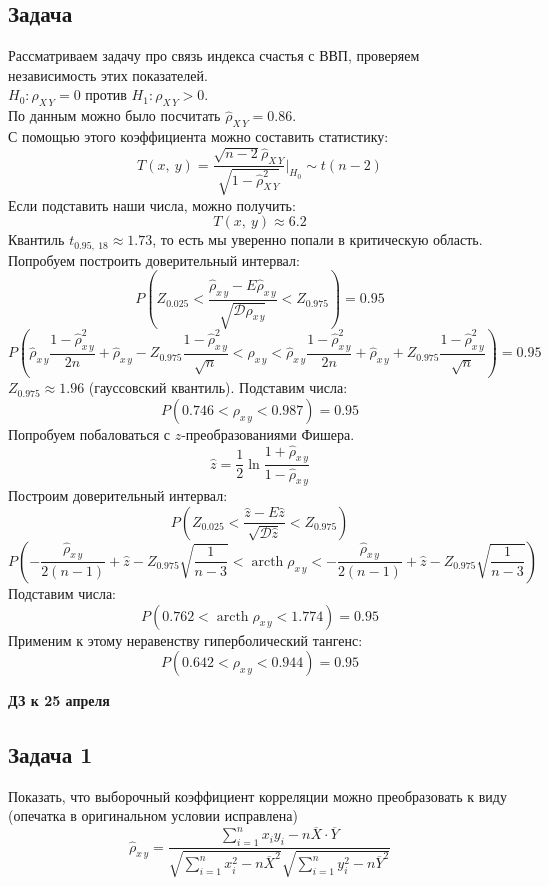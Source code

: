 \documentclass[12pt, a4paper]{article}
\newcommand{\dev}{\mathcal{D}}
\begin{document}
\subsection*{Задача}
Рассматриваем задачу про связь индекса счастья с ВВП, проверяем независимость этих показателей.\\
$H_0: \rho_{X\, Y} = 0$ против $H_1: \rho_{X\, Y} > 0$.\\
По данным можно было посчитать $\hat \rho_{X\, Y} = 0.86$.\\
С помощью этого коэффициента можно составить статистику:
\[
T(x,\ y) = \frac{\sqrt{n - 2} \hat\rho_{X\, Y}}{\sqrt{1 - \hat \rho_{X\, Y}^2}} \Big|_{H_0} \sim t(n - 2)
\]
Если подставить наши числа, можно получить:
\[
T(x,\ y) \approx 6.2
\]
Квантиль $t_{0.95,\ 18} \approx 1.73$, то есть мы уверенно попали в критическую область.\\
Попробуем построить доверительный интервал:
\[P\left( Z_{0.025} < \frac{\hat \rho_{x\, y} - E\hat \rho_{x\, y}}{\sqrt{\dev \hat \rho_{x\, y}}} < Z_{0.975} \right) = 0.95\]
\[P\left( \hat \rho_{x\, y} \frac{1 - \hat\rho^2_{x\, y}}{2n} + \hat \rho_{x\, y} - Z_{0.975} \frac{1 - \hat\rho_{x\, y}^2}{\sqrt{n}} < \rho_{x\, y} < \hat\rho_{x\, y} \frac{1 - \hat\rho^2_{x\, y}}{2n} + \hat \rho_{x\, y} + Z_{0.975} \frac{1 - \hat\rho_{x\, y}^2}{\sqrt{n}} \right) = 0.95\]
$Z_{0.975} \approx 1.96$ (гауссовский квантиль). Подставим числа:
\[P\left( 0.746 < \rho_{x\, y} < 0.987 \right) = 0.95\]
Попробуем побаловаться с $z$-преобразованиями Фишера.
\[
\hat z = \frac{1}{2} \ln \frac{1 + \hat \rho_{x\, y}}{1 - \hat \rho_{x\, y}}
\]
Построим доверительный интервал:
\[
P\left( Z_{0.025} < \frac{\hat z - E\hat z}{\sqrt{\dev \hat z}} < Z_{0.975} \right)
\]
\[
P\left( -\frac{\hat \rho_{x\, y}}{2(n - 1)} + \hat z - Z_{0.975} \sqrt{\frac{1}{n - 3}} < \operatorname{arcth} \rho_{x\, y} < -\frac{\hat \rho_{x\, y}}{2(n - 1)} + \hat z - Z_{0.975} \sqrt{\frac{1}{n - 3}}\right)
\]
Подставим числа:
\[
P\left( 0.762 < \operatorname{arcth} \rho_{x\, y} < 1.774 \right) = 0.95
\]
Применим к этому неравенству гиперболический тангенс:
\[
P\left( 0.642 < \rho_{x\, y} < 0.944 \right) = 0.95
\]

\begin{center}
    \bf ДЗ к 25 апреля
\end{center}

\subsection*{Задача 1}
Показать, что выборочный коэффициент корреляции можно преобразовать к виду (опечатка в оригинальном условии исправлена)
\[
\hat \rho_{x\, y} = \frac{ \sum\limits_{i = 1}^{n} x_i y_i - n\overline{X} \cdot \overline{Y} }{ \sqrt{\sum\limits_{i = 1}^{n} x_i^2 - n {\overline{X}}^2} \sqrt{ \sum\limits_{i = 1}^{n} y_i^2  - n {\overline{Y}}^2} }
\]
\end{document}
